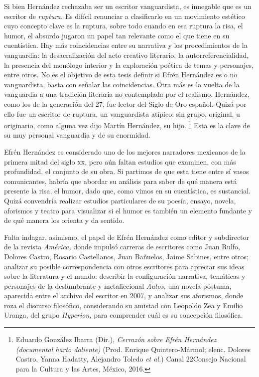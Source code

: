 \documentclass[14pt,twoside,final]{extbook} %
\let\oldfootnote\footnote
\renewcommand\footnote[1]{%
\oldfootnote{\hspace{1mm}#1}}
\begin{document}
Si bien Hernández rechazaba ser un escritor vanguardista, es innegable que es un escritor de \emph{ruptura.} Es difícil renunciar a clasificarlo en un movimiento estético cuyo concepto clave es la ruptura, sobre todo cuando en esa ruptura la risa, el humor, el absurdo jugaron un papel tan relevante como el que tiene en su cuentística. Hay más coincidencias entre su narrativa y los procedimientos de la vanguardia: la desacralización del acto creativo literario, la autorreferencialidad, la presencia del monólogo interior y la exploración poética de temas y personajes, entre otros. No es el objetivo de esta tesis definir si Efrén Hernández es o no vanguardista, basta con señalar las coincidencias. Otra más es la vuelta de la vanguardia a una tradición literaria no contemplada por el realismo. Hernández, como los de la generación del 27, fue lector del Siglo de Oro español. Quizá por ello fue un escritor de ruptura, un vanguardista atípico: sin grupo, original, u originario, como alguna vez dijo Martín Hernández, su hijo.\footnote{Eduardo González Ibarra (Dir.), \emph{Cerrazón sobre Efrén Hernández (documental harto doliente)} (Prod. Enrique Quintero-Mármol; elenc. Dolores Castro, Yanna Hadatty, Alejandro Toledo \emph{et al.}) Canal 22\kernedslash Consejo Nacional para la Cultura y las Artes, México, 2016.} Esta es la clave de su muy personal vanguardia y de su enormidad.
\def\dinkus{\bfseries\textasteriskcentered\space\textasteriskcentered\space\textasteriskcentered}
\begin{center}
\dinkus
\end{center}
Efrén Hernández es considerado uno de los mejores narradores mexicanos de la primera mitad del siglo \textsc{xx}, pero aún faltan estudios que examinen, con más profundidad, el conjunto de su obra. Si partimos de que esta tiene entre sí vasos comunicantes, habría que abordar su análisis para saber de qué manera está presente la risa, el humor, dado que, como vimos en su cuentística, es sustancial. Quizá convendría realizar estudios particulares de su poesía, ensayo, novela, aforismos y teatro para visualizar si el humor es también un elemento fundante y de qué manera los orienta y da sentido.

Falta indagar, asimismo, el papel de Efrén Hernández como editor y subdirector de la revista \emph{América,} donde impulsó carreras de escritores como Juan Rulfo, Dolores Castro, Rosario Castellanos, Juan Bañuelos, Jaime Sabines, entre otros; analizar su posible correspondencia con otros escritores para apreciar sus ideas sobre la literatura y el mundo: describir la configuración narrativa, temáticas y personajes de la deslumbrante y metaficcional \emph{Autos,} una novela póstuma, aparecida entre el archivo del escritor en 2007, y analizar sus aforismos, donde roza el discurso filosófico, considerando su amistad con Leopoldo Zea y Emilio Uranga, del grupo \emph{Hyperion,} para comprender cuál es su concepción filosófica.
\end{document}
